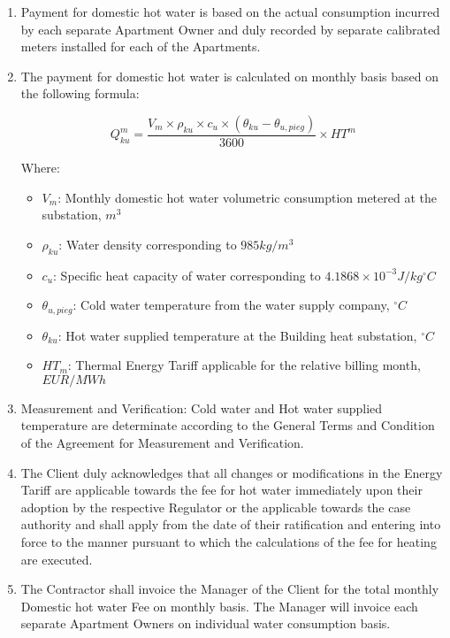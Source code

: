 \begin{enumerate}
	\item Payment for domestic hot water is based on the actual consumption incurred by each separate Apartment Owner and duly recorded by separate calibrated meters installed for each of the Apartments.
	\item The payment for domestic hot water is calculated on monthly basis based on the following formula:

\[ Q^{m}_{ku} = \frac{V_m \times \rho_{ku} \times c_u \times \left(\theta_{ku} - \theta_{u,pieg}\right)}{3600} \times HT^m \]

Where:

\begin{itemize}
	\item $V_m$: Monthly domestic hot water volumetric consumption metered at the substation, $m^3$
	\item $\rho_{ku}$: Water density corresponding to $985 kg/m^3$
	\item $c_u$: Specific heat capacity of water corresponding to $4.1868 \times 10^{-3} J/kg^\circ C$
	\item $\theta_{u,pieg}$: Cold water temperature from the water supply company, $^\circ C$
	\item $\theta_{ku}$: Hot water supplied temperature at the Building heat substation, $^\circ C$
	\item $HT_m$: Thermal Energy Tariff applicable for the relative billing month, $EUR/MWh$
\end{itemize}

	\item Measurement and Verification: Cold water and Hot water supplied temperature are determinate according to the General Terms and Condition of the Agreement for Measurement and Verification.
	\item The Client duly acknowledges that all changes or modifications in the Energy Tariff are applicable towards the fee for hot water immediately upon their adoption by the respective Regulator or the applicable towards the case authority and shall apply from the date of their ratification and entering into force to the manner pursuant to which the calculations of the fee for heating are executed.
	\item The Contractor shall invoice the Manager of the Client for the total monthly Domestic hot water Fee on monthly basis. The Manager will invoice each separate Apartment Owners on individual water consumption basis.

\end{enumerate}
